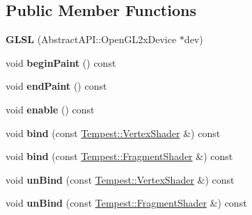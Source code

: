 \subsection*{Public Member Functions}
\begin{DoxyCompactItemize}
\item 
\hypertarget{class_tempest_1_1_g_l_s_l_ad1a4daad6c5f0c16610865bcb054a829}{{\bfseries G\+L\+S\+L} (Abstract\+A\+P\+I\+::\+Open\+G\+L2x\+Device $\ast$dev)}\label{class_tempest_1_1_g_l_s_l_ad1a4daad6c5f0c16610865bcb054a829}

\item 
\hypertarget{class_tempest_1_1_g_l_s_l_a139857104558400232263f9fde62c51d}{void {\bfseries begin\+Paint} () const }\label{class_tempest_1_1_g_l_s_l_a139857104558400232263f9fde62c51d}

\item 
\hypertarget{class_tempest_1_1_g_l_s_l_a9fb5903cd532ed11ad856866889ee4c8}{void {\bfseries end\+Paint} () const }\label{class_tempest_1_1_g_l_s_l_a9fb5903cd532ed11ad856866889ee4c8}

\item 
\hypertarget{class_tempest_1_1_g_l_s_l_a57f5dc6afd91e262a14267bc7c1ef8aa}{void {\bfseries enable} () const }\label{class_tempest_1_1_g_l_s_l_a57f5dc6afd91e262a14267bc7c1ef8aa}

\item 
\hypertarget{class_tempest_1_1_g_l_s_l_a2bb4d5cfddaa437df32aa3c506bdd2a0}{void {\bfseries bind} (const \hyperlink{class_tempest_1_1_vertex_shader}{Tempest\+::\+Vertex\+Shader} \&) const }\label{class_tempest_1_1_g_l_s_l_a2bb4d5cfddaa437df32aa3c506bdd2a0}

\item 
\hypertarget{class_tempest_1_1_g_l_s_l_a9d2327740b8d4a508643f684f15e2f47}{void {\bfseries bind} (const \hyperlink{class_tempest_1_1_fragment_shader}{Tempest\+::\+Fragment\+Shader} \&) const }\label{class_tempest_1_1_g_l_s_l_a9d2327740b8d4a508643f684f15e2f47}

\item 
\hypertarget{class_tempest_1_1_g_l_s_l_a048cdadd254cb1092fa4f868f35718fe}{void {\bfseries un\+Bind} (const \hyperlink{class_tempest_1_1_vertex_shader}{Tempest\+::\+Vertex\+Shader} \&) const }\label{class_tempest_1_1_g_l_s_l_a048cdadd254cb1092fa4f868f35718fe}

\item 
\hypertarget{class_tempest_1_1_g_l_s_l_a3a0bbafd9eb83b1aaa79b070da71ceff}{void {\bfseries un\+Bind} (const \hyperlink{class_tempest_1_1_fragment_shader}{Tempest\+::\+Fragment\+Shader} \&) const }\label{class_tempest_1_1_g_l_s_l_a3a0bbafd9eb83b1aaa79b070da71ceff}


\end{DoxyCompactItemize}
